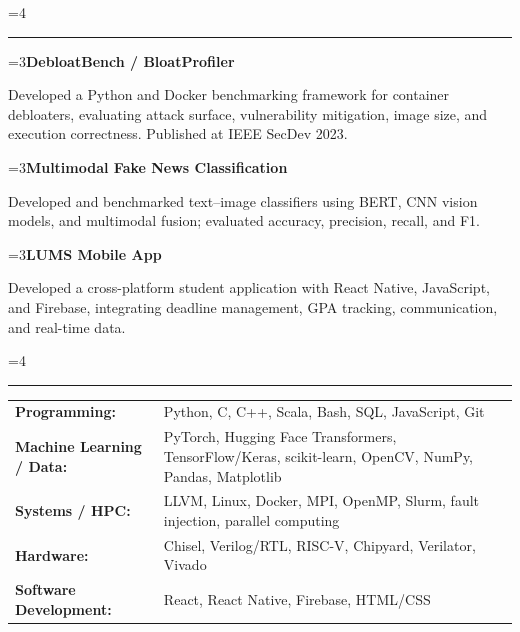 \documentclass[10pt,letterpaper]{article}
\newcommand{\needspace}[1]{\par\begingroup\dimen0=#1\relax\ifdim\dimexpr\pagegoal-\pagetotal\relax<\dimen0\vfil\break\fi\endgroup}
\renewcommand{\section}[1]{\needspace{4\baselineskip}\vspace{.82em}{\normalsize\bfseries #1\par}\vspace{.16em}\hrule\vspace{.38em}}
\newcommand{\projectentry}[2]{\needspace{3\baselineskip}\textbf{#1}\par{\small #2\par}\vspace{.38em}}
\begin{document}
\section{Selected Technical Projects}
\projectentry{DebloatBench / BloatProfiler}{Developed a Python and Docker benchmarking framework for container debloaters, evaluating attack surface, vulnerability mitigation, image size, and execution correctness. Published at IEEE SecDev 2023.}
\projectentry{Multimodal Fake News Classification}{Developed and benchmarked text--image classifiers using BERT, CNN vision models, and multimodal fusion; evaluated accuracy, precision, recall, and F1.}
\projectentry{LUMS Mobile App}{Developed a cross-platform student application with React Native, JavaScript, and Firebase, integrating deadline management, GPA tracking, communication, and real-time data.}

\section{Technical Skills}
\begin{tabularx}{\textwidth}{@{}lX@{}}
  \textbf{Programming:} & Python, C, C++, Scala, Bash, SQL, JavaScript, Git \\
  \textbf{Machine Learning / Data:} & PyTorch, Hugging Face Transformers, TensorFlow/Keras, scikit-learn, OpenCV, NumPy, Pandas, Matplotlib \\
  \textbf{Systems / HPC:} & LLVM, Linux, Docker, MPI, OpenMP, Slurm, fault injection, parallel computing \\
  \textbf{Hardware:} & Chisel, Verilog/RTL, RISC-V, Chipyard, Verilator, Vivado \\
  \textbf{Software Development:} & React, React Native, Firebase, HTML/CSS
\end{tabularx}
\end{document}
